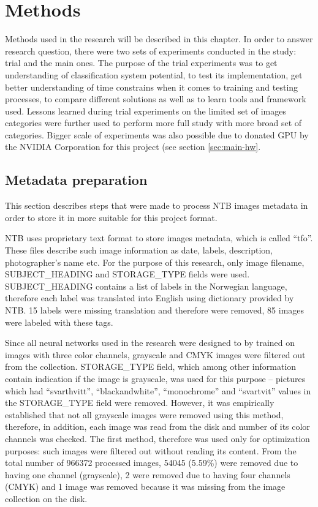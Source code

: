 \chapter{Methods}
\label{chap:methods}

Methods used in the research will be described in this chapter. In order to answer research question, there were two sets of experiments conducted in the study: trial and the main ones. The purpose of the trial experiments was to get understanding of classification system potential, to test its implementation, get better understanding of time constrains when it comes to training and testing processes, to compare different solutions as well as to learn tools and framework used. Lessons learned during trial experiments on the limited set of images categories were further used to perform more full study with more broad set of categories. Bigger scale of experiments was also possible due to donated GPU by the NVIDIA Corporation for this project (see section \ref{sec:main-hw}.


\section{Metadata preparation}
This section describes steps that were made to process NTB images metadata in order to store it in more suitable for this project format.

NTB uses proprietary text format to store images metadata, which is called ``tfo''. These files describe such image information as date, labels, description, photographer's name etc. For the purpose of this research, only image filename, SUBJECT\_HEADING and STORAGE\_TYPE fields were used. SUBJECT\_HEADING contains a list of labels in the Norwegian language, therefore each label was translated into English using dictionary provided by NTB. 15 labels were missing translation and therefore were removed, 85 images were labeled with these tags.

Since all neural networks used in the research were designed to by trained on images with three color channels, grayscale and CMYK images were filtered out from the collection. STORAGE\_TYPE field, which among other information contain indication if the image is grayscale, was used for this purpose -- pictures which had ``svarthvitt'', ``blackandwhite'', ``monochrome'' and ``svartvit'' values in the STORAGE\_TYPE field were removed. However, it was empirically established that not all grayscale images were removed using this method, therefore, in addition, each image was read from the disk and number of its color channels was checked. The first method, therefore was used only for optimization purposes: such images were filtered out without reading its content. From the total number of 966372 processed images, 54045 (5.59\%) were removed due to having one channel (grayscale), 2 were removed due to having four channels (CMYK) and 1 image was removed because it was missing from the image collection on the disk.

